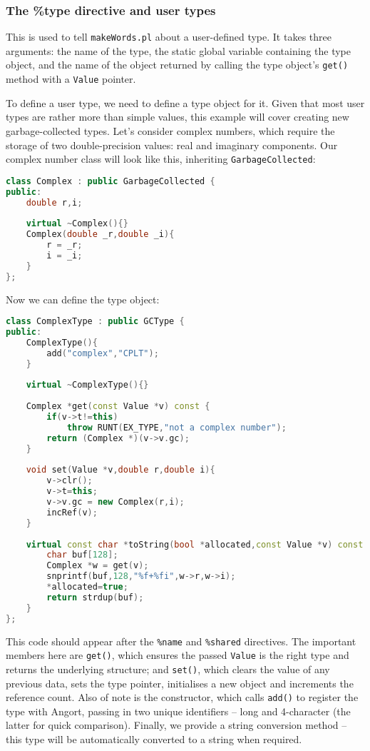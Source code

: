 \subsubsection{The \%type directive and user types}
This is used to tell \texttt{makeWords.pl} about a user-defined
type. It takes three arguments: the name of the type,
the static global variable containing the type object,
and the name of the object returned by calling the type object's
\texttt{get()} method with a \texttt{Value} pointer.

To define a user type, we need to define a type object for it.
Given that most user types are rather more than simple values,
this example will cover creating new garbage-collected types.
Let's consider complex numbers, which require the storage of two
double-precision values: real and imaginary components.
Our complex number class will look like this, inheriting
\texttt{GarbageCollected}:
\begin{lstlisting}[language=c++]
class Complex : public GarbageCollected {
public:
    double r,i;
    
    virtual ~Complex(){}
    Complex(double _r,double _i){
        r = _r;
        i = _i;
    }
};
\end{lstlisting}
Now we can define the type object:
\begin{lstlisting}[language=c++]
class ComplexType : public GCType {
public:
    ComplexType(){
        add("complex","CPLT");
    }
    
    virtual ~ComplexType(){}
    
    Complex *get(const Value *v) const {
        if(v->t!=this)
            throw RUNT(EX_TYPE,"not a complex number");
        return (Complex *)(v->v.gc);
    }
    
    void set(Value *v,double r,double i){
        v->clr();
        v->t=this;
        v->v.gc = new Complex(r,i);
        incRef(v);
    }
    
    virtual const char *toString(bool *allocated,const Value *v) const {
        char buf[128];
        Complex *w = get(v);
        snprintf(buf,128,"%f+%fi",w->r,w->i);
        *allocated=true;
        return strdup(buf);
    }
};
\end{lstlisting}
This code should appear after the \texttt{\%name} and
\texttt{\%shared} directives.
The important members here are \texttt{get()}, which ensures the
passed \texttt{Value} is the right type and returns the underlying
structure; and \texttt{set()}, which clears the value of any
previous data, sets the type pointer, initialises a new object
and increments the reference count. Also of note is
the constructor, which calls \texttt{add()} to register the type
with Angort, passing in two unique identifiers -- long and 4-character
(the latter for quick comparison). Finally, we provide a string conversion
method -- this type will be automatically converted to a string
when required.

